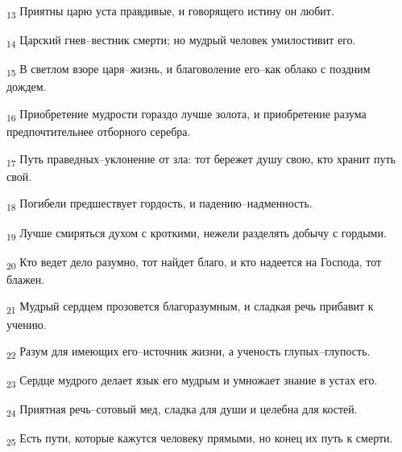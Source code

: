 \begin{tcolorbox}
\textsubscript{13} Приятны царю уста правдивые, и говорящего истину он любит.
\end{tcolorbox}
\begin{tcolorbox}
\textsubscript{14} Царский гнев--вестник смерти; но мудрый человек умилостивит его.
\end{tcolorbox}
\begin{tcolorbox}
\textsubscript{15} В светлом взоре царя--жизнь, и благоволение его--как облако с поздним дождем.
\end{tcolorbox}
\begin{tcolorbox}
\textsubscript{16} Приобретение мудрости гораздо лучше золота, и приобретение разума предпочтительнее отборного серебра.
\end{tcolorbox}
\begin{tcolorbox}
\textsubscript{17} Путь праведных--уклонение от зла: тот бережет душу свою, кто хранит путь свой.
\end{tcolorbox}
\begin{tcolorbox}
\textsubscript{18} Погибели предшествует гордость, и падению--надменность.
\end{tcolorbox}
\begin{tcolorbox}
\textsubscript{19} Лучше смиряться духом с кроткими, нежели разделять добычу с гордыми.
\end{tcolorbox}
\begin{tcolorbox}
\textsubscript{20} Кто ведет дело разумно, тот найдет благо, и кто надеется на Господа, тот блажен.
\end{tcolorbox}
\begin{tcolorbox}
\textsubscript{21} Мудрый сердцем прозовется благоразумным, и сладкая речь прибавит к учению.
\end{tcolorbox}
\begin{tcolorbox}
\textsubscript{22} Разум для имеющих его--источник жизни, а ученость глупых--глупость.
\end{tcolorbox}
\begin{tcolorbox}
\textsubscript{23} Сердце мудрого делает язык его мудрым и умножает знание в устах его.
\end{tcolorbox}
\begin{tcolorbox}
\textsubscript{24} Приятная речь--сотовый мед, сладка для души и целебна для костей.
\end{tcolorbox}
\begin{tcolorbox}
\textsubscript{25} Есть пути, которые кажутся человеку прямыми, но конец их путь к смерти.
\end{tcolorbox}
